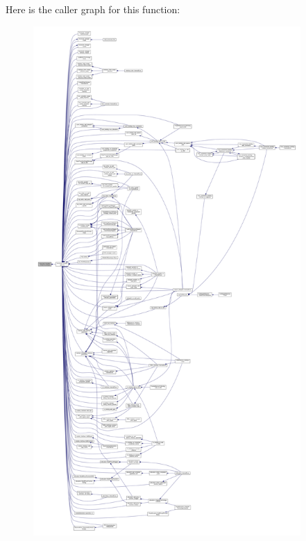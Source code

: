 Here is the caller graph for this function\+:
\nopagebreak
\begin{figure}[H]
\begin{center}
\leavevmode
\includegraphics[height=550pt]{d7/d6b/classstructural__manager_a84ce3ac584d5d9d216e49ff09abdc9e5_icgraph}
\end{center}
\end{figure}
\mbox{\label{classstructural__manager_a0f66e3ac5c1075e8600c1ac69846866c}} 
